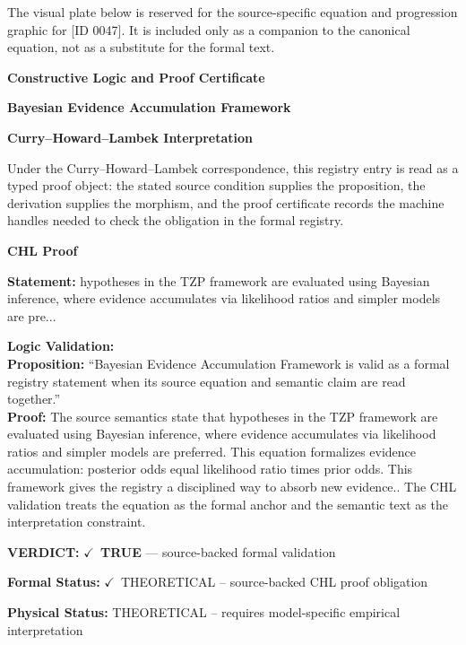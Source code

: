 \begingroup\footnotesize\sloppy
The visual plate below is reserved for the source-specific equation and progression graphic for [ID 0047]. It is included only as a companion to the canonical equation, not as a substitute for the formal text.
\par\endgroup
\ifTZPDarkEdition
{}
\fi

\clearpage
\begingroup\tzpsupportsetup
\noindent\textbf{\fontsize{10.8pt}{12.8pt}\selectfont [ID 0047] Constructive Logic and Proof Certificate}\par
\noindent\textbf{\fontsize{10pt}{12pt}\selectfont Bayesian Evidence Accumulation Framework}\par
\vspace{0.45em}
\begingroup
\footnotesize
\setlength{\parskip}{0.22em}
\setlength{\parindent}{0pt}
\noindent\textbf{Curry--Howard--Lambek Interpretation}\par
Under the Curry--Howard--Lambek correspondence, this registry entry is read as a typed proof
object: the stated source condition supplies the proposition, the derivation supplies the
morphism, and the proof certificate records the machine handles needed to check the obligation
in the formal registry.

\vspace{0.45em}
\noindent\textbf{CHL Proof}\par
\textbf{Statement:} hypotheses in the TZP framework are evaluated using Bayesian inference, where evidence
accumulates via likelihood ratios and simpler models are pre...

\textbf{Logic Validation:}\\
\textbf{Proposition:} ``Bayesian Evidence Accumulation Framework is valid as a formal registry statement when
its source equation and semantic claim are read together.''\\
\textbf{Proof:} The source semantics state that hypotheses in the TZP framework are evaluated using
Bayesian inference, where evidence accumulates via likelihood ratios and simpler models
are preferred. This equation formalizes evidence accumulation: posterior odds equal
likelihood ratio times prior odds. This framework gives the registry a disciplined way
to absorb new evidence.. The CHL validation treats the equation as the formal anchor and
the semantic text as the interpretation constraint.

\textbf{VERDICT:} \ensuremath{\checkmark}\ \textbf{TRUE} --- source-backed formal validation

\textbf{Formal Status:} \ensuremath{\checkmark}\ THEORETICAL -- source-backed CHL proof obligation

\textbf{Physical Status:} THEORETICAL -- requires model-specific empirical interpretation
\par\vspace{0.45em}
\par
\ifTZPDarkEdition
{}
\fi
\endgroup
\endgroup
